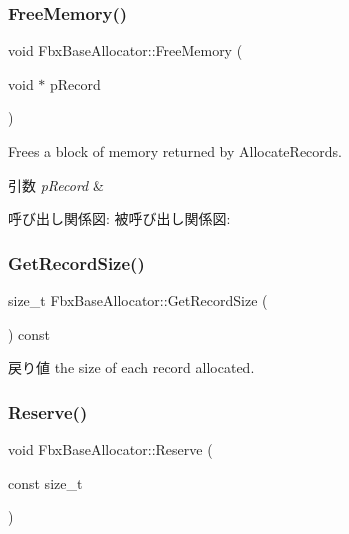 \subsubsection{\texorpdfstring{Free\+Memory()}{FreeMemory()}}
{\footnotesize\ttfamily void Fbx\+Base\+Allocator\+::\+Free\+Memory (\begin{DoxyParamCaption}\item[{void $\ast$}]{p\+Record }\end{DoxyParamCaption})}

Frees a block of memory returned by Allocate\+Records. 
\begin{DoxyParams}{引数}
{\em p\+Record} & \\
\hline
\end{DoxyParams}
呼び出し関係図\+:
被呼び出し関係図\+:
\mbox{\label{class_fbx_base_allocator_ab7aa3164aa6fc973baca1515b494198f}} 
\subsubsection{\texorpdfstring{Get\+Record\+Size()}{GetRecordSize()}}
{\footnotesize\ttfamily size\+\_\+t Fbx\+Base\+Allocator\+::\+Get\+Record\+Size (\begin{DoxyParamCaption}{ }\end{DoxyParamCaption}) const}

\begin{DoxyReturn}{戻り値}
the size of each record allocated. 
\end{DoxyReturn}
\mbox{\label{class_fbx_base_allocator_ad84870f23a2b067b3bade2604dab2621}} 
\subsubsection{\texorpdfstring{Reserve()}{Reserve()}}
{\footnotesize\ttfamily void Fbx\+Base\+Allocator\+::\+Reserve (\begin{DoxyParamCaption}\item[{const size\+\_\+t}]{ }\end{DoxyParamCaption})}

